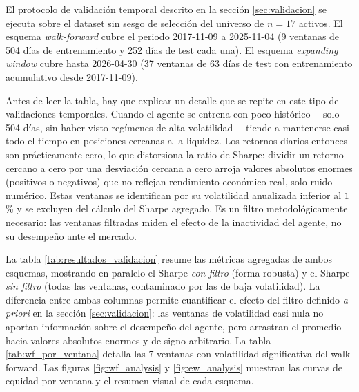 \documentclass[IB,a4paper]{TFUOC}
\begin{document}
El protocolo de validación temporal descrito en la sección \ref{sec:validacion} se ejecuta sobre el dataset sin sesgo de selección del universo de $n=17$ activos. El esquema \textit{walk-forward} cubre el periodo 2017-11-09 a 2025-11-04 (9 ventanas de 504 días de entrenamiento y 252 días de test cada una). El esquema \textit{expanding window} cubre hasta 2026-04-30 (37 ventanas de 63 días de test con entrenamiento acumulativo desde 2017-11-09).

Antes de leer la tabla, hay que explicar un detalle que se repite en este tipo de validaciones temporales. Cuando el agente se entrena con poco histórico —solo 504 días, sin haber visto regímenes de alta volatilidad— tiende a mantenerse casi todo el tiempo en posiciones cercanas a la liquidez. Los retornos diarios entonces son prácticamente cero, lo que distorsiona la ratio de Sharpe: dividir un retorno cercano a cero por una desviación cercana a cero arroja valores absolutos enormes (positivos o negativos) que no reflejan rendimiento económico real, solo ruido numérico. Estas ventanas se identifican por su volatilidad anualizada inferior al $1$\,\% y se excluyen del cálculo del Sharpe agregado. Es un filtro metodológicamente necesario: las ventanas filtradas miden el efecto de la inactividad del agente, no su desempeño ante el mercado.

La tabla \ref{tab:resultados_validacion} resume las métricas agregadas de ambos esquemas, mostrando en paralelo el Sharpe \emph{con filtro} (forma robusta) y el Sharpe \emph{sin filtro} (todas las ventanas, contaminado por las de baja volatilidad). La diferencia entre ambas columnas permite cuantificar el efecto del filtro definido \textit{a priori} en la sección \ref{sec:validacion}: las ventanas de volatilidad casi nula no aportan información sobre el desempeño del agente, pero arrastran el promedio hacia valores absolutos enormes y de signo arbitrario. La tabla \ref{tab:wf_por_ventana} detalla las 7 ventanas con volatilidad significativa del walk-forward. Las figuras \ref{fig:wf_analysis} y \ref{fig:ew_analysis} muestran las curvas de equidad por ventana y el resumen visual de cada esquema.
\end{document}
